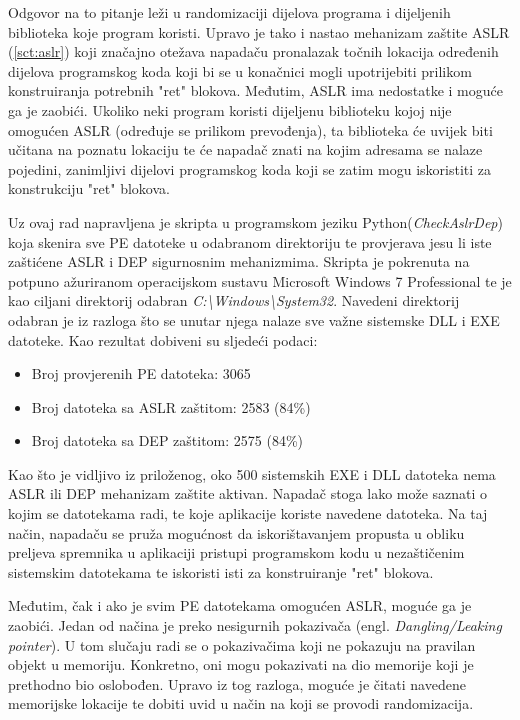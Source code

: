 \documentclass[times, utf8, diplomski, numeric]{fer}
\begin{document}
Odgovor na to pitanje leži u randomizaciji dijelova programa i dijeljenih biblioteka koje program koristi. Upravo je tako i nastao mehanizam zaštite ASLR (\ref{sct:aslr}) koji značajno otežava napadaču pronalazak točnih lokacija određenih dijelova programskog koda koji bi se u konačnici mogli upotrijebiti prilikom konstruiranja potrebnih "ret" blokova. Međutim, ASLR ima nedostatke i moguće ga je zaobići. Ukoliko neki program koristi dijeljenu biblioteku kojoj nije omogućen ASLR (određuje se prilikom prevođenja), ta biblioteka će uvijek biti učitana na poznatu lokaciju te će napadač znati na kojim adresama se nalaze pojedini, zanimljivi dijelovi programskog koda koji se zatim mogu iskoristiti za konstrukciju "ret" blokova.

Uz ovaj rad napravljena je skripta u programskom jeziku Python(\emph{CheckAslrDep}) koja skenira sve PE datoteke u odabranom direktoriju te provjerava jesu li iste zaštićene ASLR i DEP sigurnosnim mehanizmima. Skripta je pokrenuta na potpuno ažuriranom operacijskom sustavu Microsoft Windows 7 Professional te je kao ciljani direktorij odabran \emph{C:\textbackslash Windows\textbackslash System32}. Navedeni direktorij odabran je iz razloga što se unutar njega nalaze sve važne sistemske DLL i EXE datoteke. Kao rezultat dobiveni su sljedeći podaci:
\begin{itemize}
\item Broj provjerenih PE datoteka: 3065
\item Broj datoteka sa ASLR zaštitom: 2583 (84\%)
\item Broj datoteka sa DEP zaštitom: 2575 (84\%)
\end{itemize}
Kao što je vidljivo iz priloženog, oko 500 sistemskih EXE i DLL datoteka nema ASLR ili DEP mehanizam zaštite aktivan. Napadač stoga lako može saznati o kojim se datotekama radi, te koje aplikacije koriste navedene datoteka. Na taj način, napadaču se pruža mogućnost da iskorištavanjem propusta u obliku preljeva spremnika u aplikaciji pristupi programskom kodu u nezaštičenim sistemskim datotekama te iskoristi isti za konstruiranje "ret" blokova.

Međutim, čak i ako je svim PE datotekama omogućen ASLR, moguće ga je zaobići. Jedan od načina je preko nesigurnih pokazivača (engl. \emph{Dangling/Leaking pointer}). U tom slučaju radi se o pokazivačima koji ne pokazuju na pravilan objekt u memoriju. Konkretno, oni mogu pokazivati na dio memorije koji je prethodno bio oslobođen. Upravo iz tog razloga, moguće je čitati navedene memorijske lokacije te dobiti uvid u način na koji se provodi randomizacija.
\end{document}
